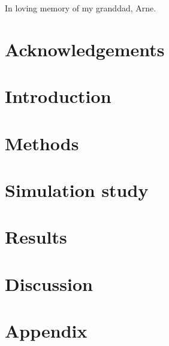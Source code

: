 \documentclass[11pt]{article}
\numberwithin{equation}{section}
\begin{document}
\pagestyle{fancy}
\fancyfoot{}
\fancyfoot[C]{\thepage}
\renewcommand{\headrulewidth}{0pt}
\renewcommand{\footrulewidth}{0pt}
\allowdisplaybreaks



\noindent In loving memory of my granddad, Arne.
\section*{Acknowledgements}

\newpage
\begin{abstract}
    
\end{abstract}
\newpage
\tableofcontents
\newpage
\section{Introduction}\label{Introduction}

\section{Methods}\label{Methods}

\section{Simulation study}\label{Simulaton study}

\newpage
\section{Results}\label{Results}

\section{Discussion}\label{Discussion}

\newpage

\newpage
\appendix
\section*{Appendix}\label{Appendix}

\end{document}
